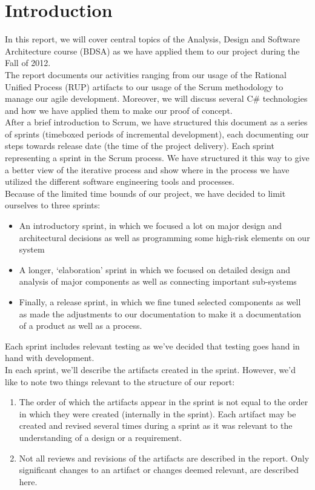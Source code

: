 \section{Introduction}
In this report, we will cover central topics of the Analysis, Design and Software Architecture course (BDSA) as we have applied them to our project during the Fall of 2012.\\
\newline
The report documents our activities ranging from our usage of the Rational Unified Process (RUP) artifacts \cite[p.~31]{OOAD} to our usage of the Scrum methodology to manage our agile development. Moreover, we will discuss several C\# technologies and how we have applied them to make our proof of concept.\\
\newline
After a brief introduction to Scrum, we have structured this document as a series of sprints (timeboxed periods of incremental development), each documenting our steps towards release date (the time of the project delivery). Each sprint representing a sprint in the Scrum process. We have structured it this way to give a better view of the iterative process and show where in the process we have utilized the different software engineering tools and processes.\\
\newline
Because of the limited time bounds of our project, we have decided to limit ourselves to three sprints:\\
\begin{itemize}
\item An introductory sprint, in which we focused a lot on major design and architectural decisions as well as programming some high-risk elements on our system
\item A longer, ‘elaboration’ sprint in which we focused on detailed design and analysis of major components as well as connecting important sub-systems 
\item Finally, a release sprint, in which we fine tuned selected components as well as made the adjustments to our documentation to make it a documentation of a product as well as a process.
\end{itemize}
Each sprint includes relevant testing as we’ve decided that testing goes hand in hand with development.\\
\newline
In each sprint, we’ll describe the artifacts created in the sprint. However,
we’d like to note two things relevant to the structure of our report:\\
\begin{enumerate}
\item The order of which the artifacts appear in the sprint is not equal to the
  order in which they were created (internally in the sprint). Each artifact
  may be created and revised several times during a sprint as it was relevant
  to the understanding of a design or a requirement. 
\item Not all reviews and revisions of the artifacts are described in the
  report. Only significant changes to an artifact or changes deemed relevant,
  are described here.
\end{enumerate}
